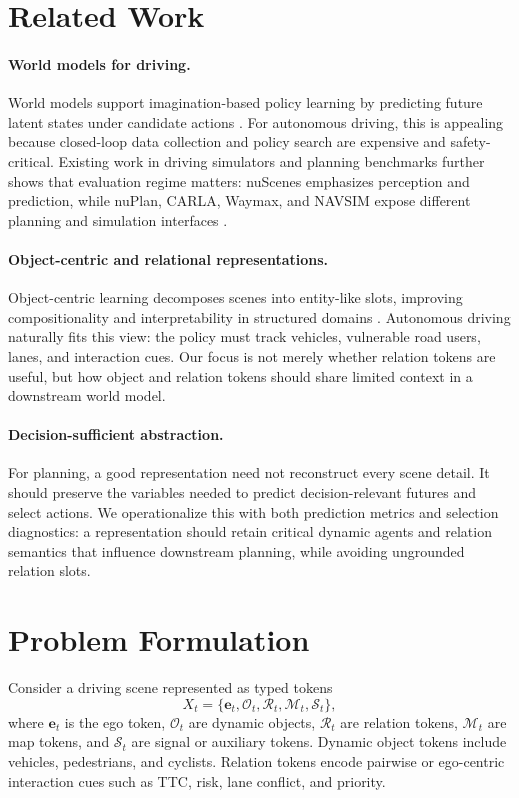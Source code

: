 \documentclass[10pt]{article}
\begin{document}
\section{Related Work}
\paragraph{World models for driving.}
World models support imagination-based policy learning by predicting future latent states under candidate actions \citep{ha2018worldmodels,hafner2023dreamerv3}. For autonomous driving, this is appealing because closed-loop data collection and policy search are expensive and safety-critical. Existing work in driving simulators and planning benchmarks further shows that evaluation regime matters: nuScenes emphasizes perception and prediction, while nuPlan, CARLA, Waymax, and NAVSIM expose different planning and simulation interfaces \citep{caesar2020nuscenes,caesar2021nuplan,dosovitskiy2017carla,mao2023waymax,dauner2024navsim}.

\paragraph{Object-centric and relational representations.}
Object-centric learning decomposes scenes into entity-like slots, improving compositionality and interpretability in structured domains \citep{locatello2020slotattention}. Autonomous driving naturally fits this view: the policy must track vehicles, vulnerable road users, lanes, and interaction cues. Our focus is not merely whether relation tokens are useful, but how object and relation tokens should share limited context in a downstream world model.

\paragraph{Decision-sufficient abstraction.}
For planning, a good representation need not reconstruct every scene detail. It should preserve the variables needed to predict decision-relevant futures and select actions. We operationalize this with both prediction metrics and selection diagnostics: a representation should retain critical dynamic agents and relation semantics that influence downstream planning, while avoiding ungrounded relation slots.

\section{Problem Formulation}
Consider a driving scene represented as typed tokens
\begin{equation}
    X_t = \{\mathbf{e}_t, \mathcal{O}_t, \mathcal{R}_t, \mathcal{M}_t, \mathcal{S}_t\},
\end{equation}
where $\mathbf{e}_t$ is the ego token, $\mathcal{O}_t$ are dynamic objects, $\mathcal{R}_t$ are relation tokens, $\mathcal{M}_t$ are map tokens, and $\mathcal{S}_t$ are signal or auxiliary tokens. Dynamic object tokens include vehicles, pedestrians, and cyclists. Relation tokens encode pairwise or ego-centric interaction cues such as TTC, risk, lane conflict, and priority.
\end{document}
